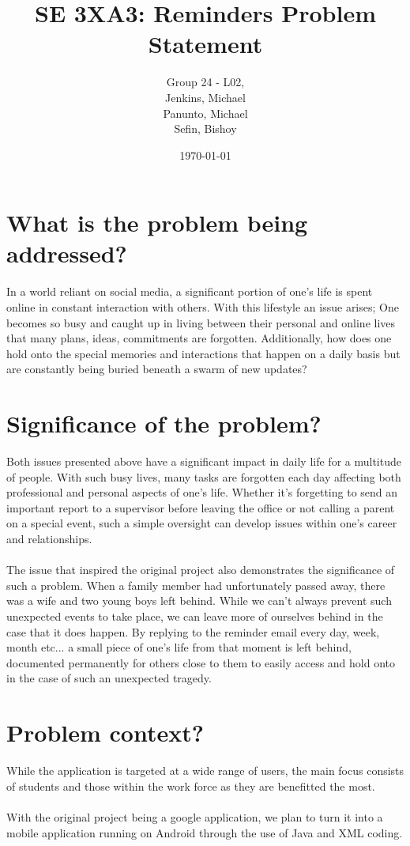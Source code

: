 \documentclass[a4paper]{article}
\title{SE 3XA3: Reminders Problem Statement}
\date{\today}
\author{
    Group 24 - L02,
    \\ Jenkins, Michael
    \\ Panunto, Michael
    \\ Sefin, Bishoy
}
\begin{document}
\maketitle

\setcounter{secnumdepth}{0}

\newpage

\section{What is the problem being addressed?}

In a world reliant on social media, a significant portion of one's life is spent online in constant interaction with others. With this lifestyle an issue arises; One becomes so busy and caught up in living between their personal and online lives that many plans, ideas, commitments are forgotten. Additionally, how does one hold onto the special memories and interactions that happen on a daily basis but are constantly being buried beneath a swarm of new updates?

\section{Significance of the problem?}

Both issues presented above have a significant impact in daily life for a multitude of people. With such busy lives, many tasks are forgotten each day affecting both professional and personal aspects of one's life. Whether it's forgetting to send an important report to a supervisor before leaving the office or not calling a parent on a special event, such a simple oversight can develop issues within one's career and relationships. 
~\\~\\
The issue that inspired the original project also demonstrates the significance of such a problem. When a family member had unfortunately passed away, there was a wife and two young boys left behind. While we can't always prevent such unexpected events to take place, we can leave more of ourselves behind in the case that it does happen. By replying to the reminder email every day, week, month etc... a small piece of one's life from that moment is left behind, documented permanently for others close to them to easily access and hold onto in the case of such an unexpected tragedy. 

\section{Problem context?}

While the application is targeted at a wide range of users, the main focus consists of students and those within the work force as they are benefitted the most.
~\\~\\
With the original project being a google application, we plan to turn it into a mobile application running on Android through the use of Java and XML coding. 
\end{document}
